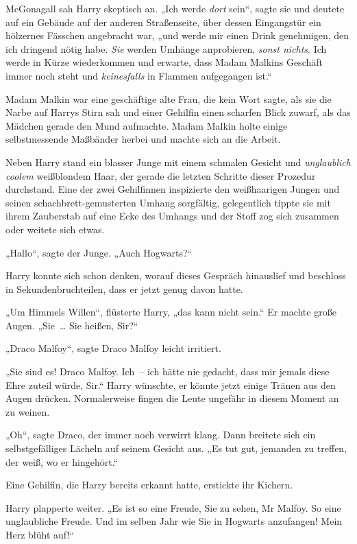 {McGonagall sah Harry skeptisch an. „Ich werde \emph{dort} sein“, sagte sie und deutete auf ein Gebäude auf der anderen Straßenseite, über dessen Eingangstür ein hölzernes Fässchen angebracht war, „und werde mir einen Drink genehmigen, den ich dringend nötig habe. \emph{Sie} werden Umhänge anprobieren, \emph{sonst nichts}. Ich werde in Kürze wiederkommen und erwarte, dass Madam Malkins Geschäft immer noch steht und \emph{keinesfalls} in Flammen aufgegangen ist.“

Madam Malkin war eine geschäftige alte Frau, die kein Wort sagte, als sie die Narbe auf Harrys Stirn sah und einer Gehilfin einen scharfen Blick zuwarf, als das Mädchen gerade den Mund aufmachte. Madam Malkin holte einige selbstmessende Maßbänder herbei und machte sich an die Arbeit.

Neben Harry stand ein blasser Junge mit einem schmalen Gesicht und \emph{unglaublich coolem} weißblondem Haar, der gerade die letzten Schritte dieser Prozedur durchstand. Eine der zwei Gehilfinnen inspizierte den weißhaarigen Jungen und seinen schachbrett-gemusterten Umhang sorgfältig, gelegentlich tippte sie mit ihrem Zauberstab auf eine Ecke des Umhangs und der Stoff zog sich zusammen oder weitete sich etwas.

„Hallo“, sagte der Junge. „Auch Hogwarts?“

Harry konnte sich schon denken, worauf dieses Gespräch hinauslief und beschloss in Sekundenbruchteilen, dass er jetzt genug davon hatte.

„Um Himmels Willen“, flüsterte Harry, „das kann nicht sein.“ Er machte große Augen. „Sie~… Sie heißen, Sir?“

„Draco Malfoy“, sagte Draco Malfoy leicht irritiert.

„Sie sind es! Draco Malfoy. Ich~-- ich hätte nie gedacht, dass mir jemals diese Ehre zuteil würde, Sir.“ Harry wünschte, er könnte jetzt einige Tränen aus den Augen drücken. Normalerweise fingen die Leute ungefähr in diesem Moment an zu weinen.

„Oh“, sagte Draco, der immer noch verwirrt klang. Dann breitete sich ein selbstgefälliges Lächeln auf seinem Gesicht aus. „Es tut gut, jemanden zu treffen, der weiß, wo er hingehört.“

Eine Gehilfin, die Harry bereits erkannt hatte, erstickte ihr Kichern.

Harry plapperte weiter. „Es ist so eine Freude, Sie zu sehen, Mr Malfoy. So eine unglaubliche Freude. Und im selben Jahr wie Sie in Hogwarts anzufangen! Mein Herz blüht auf!“

}
